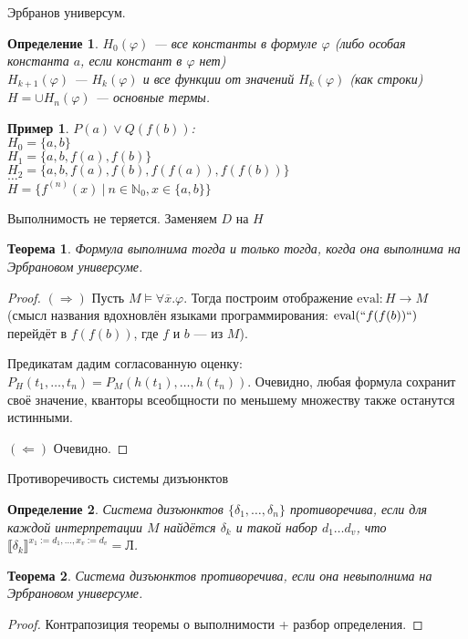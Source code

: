 \documentclass[aspectratio=169]{beamer}
\newtheorem{thm}{Теорема}[section]
\newtheorem{dfn}{Определение}[section]
\newtheorem{exm}{Пример}[section]
\begin{document}
\begin{frame}{Эрбранов универсум.}
\begin{dfn}$H_0(\varphi)$ --- все константы в формуле $\varphi$ (либо особая константа $a$, если констант в $\varphi$ нет)\\
$H_{k+1}(\varphi)$ --- $H_k(\varphi)$ и все функции от значений $H_k(\varphi)$ (как строки)\\

$H = \cup H_n(\varphi)$ --- основные термы.
\end{dfn}

\begin{exm}$P(a)\vee Q(f(b))$: \\
$H_0 = \{a,b\}$\\
$H_1 = \{a,b,f(a),f(b)\}$\\
$H_2 = \{a,b,f(a),f(b),f(f(a)),f(f(b))\}$\\
$\dots$\\
$H = \{f^{(n)}(x)\ |\ n \in \mathbb{N}_0, x \in \{a,b\}\}$\end{exm}
\end{frame}

\begin{frame}{Выполнимость не теряется. Заменяем $D$ на $H$}
\begin{thm}Формула выполнима тогда и только тогда, когда она выполнима на Эрбрановом универсуме.\end{thm}
\begin{proof}
$(\Rightarrow)$ Пусть $M \models\forall \overline{x}.\varphi$. Тогда построим отображение $\text{eval}: H \rightarrow M$
(смысл названия вдохновлён языками программирования: $\text{eval}(``f(f(b))``)$ перейдёт в $f(f(b))$, где $f$ и $b$ --- из $M$).

Предикатам дадим согласованную оценку:
$P_H(t_1,\dots,t_n) = P_M(h(t_1),\dots,h(t_n))$. Очевидно, любая формула сохранит своё значение, кванторы всеобщности
по меньшему множеству также останутся истинными.

$(\Leftarrow)$ Очевидно.
\end{proof}\end{frame}

\begin{frame}{Противоречивость системы дизъюнктов}
\begin{dfn}Система дизъюнктов $\{\delta_1,\dots,\delta_n\}$ противоречива,
если для каждой интерпретации $M$ найдётся $\delta_k$ и такой набор $d_1\dots d_v$,
что $\llbracket\delta_k\rrbracket^{x_1 := d_1, \dots, x_v := d_v} = \text{Л}$.\end{dfn}
\begin{thm}Система дизъюнктов противоречива, если она невыполнима на Эрбрановом универсуме.\end{thm}
\begin{proof}Контрапозиция теоремы о выполнимости + разбор определения.
\end{proof}
\end{frame}
\end{document}
